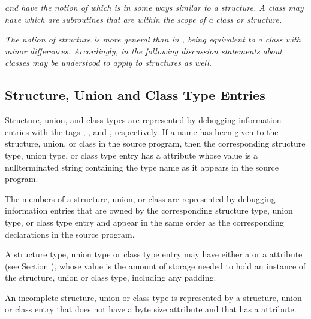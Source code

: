 \textit{ and 
 have the notion of  which is in some
ways similar to a structure. A class may have  which are subroutines that are within the scope
of a class or structure.}

\textit{The  notion of 
structure is more general than in , being
equivalent to a class with minor differences. Accordingly,
in the following discussion statements about 
 classes may
be understood to apply to  structures as well.}

\subsection{Structure, Union and Class Type Entries}
\label{chap:structureunionandclasstypeentries}


Structure, union, and class types are represented by debugging
information entries 
with 
the tags 
\DWTAGstructuretypeTARG,
\DWTAGuniontypeTARG, 
and \DWTAGclasstypeTARG,
respectively. If a name has been given to the structure,
union, or class in the source program, then the corresponding
structure type, union type, or class type entry has a
\DWATname{} attribute 
whose value is a null\dash terminated string
containing the type name as it appears in the source program.

The members of a structure, union, or class are represented
by debugging information entries that are owned by the
corresponding structure type, union type, or class type entry
and appear in the same order as the corresponding declarations
in the source program.

A structure type, union type or class type entry may have
either a \DWATbytesize{} or a
\DWATbitsize{} attribute 
\hypertarget{chap:DWATbitsizedatamemberbitsize}{}
(see Section ), 
whose value is the amount of storage needed
to hold an instance of the structure, union or class type,
including any padding.
  
An incomplete structure, union or class type 
is 
represented by a structure, union or class
entry that does not have a byte size attribute and that has
a \DWATdeclaration{} attribute.

